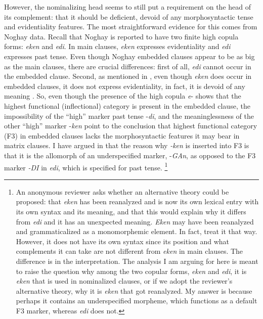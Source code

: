 \documentclass[output=paper]{langsci/langscibook}
\begin{document}
However, the nominalizing head seems to still put a requirement on the head of its complement: 
that it should be deficient, devoid of any morphosyntactic tense and evidentiality features. 
The most straightforward evidence for this comes from Noghay data. 
Recall that Noghay is reported to have two finite high copula forms: \textit{eken} and \textit{edi}. 
In main clauses, \textit{eken} expresses evidentiality and \textit{edi} expresses past tense. 
Even though Noghay embedded clauses appear to be as big as the main clauses, there are crucial differences: 
first of all, \textit{edi} cannot occur in the embedded clause. 
Second, as mentioned in , even though \textit{eken} does occur in embedded clauses, it does not express evidentiality, in fact, it is devoid of any meaning \citep{Karakoc2007}. 
So, even though the presence of the high copula \textit{e}{}- shows that the highest functional (inflectional) category is present in the embedded clause, the impossibility of the ``high'' marker past tense -\textit{di}, and the meaninglessness of the other ``high'' marker -\textit{ken} point to the conclusion that highest functional category (F3) in embedded clauses lacks the morphosyntactic features it may bear in matrix clauses. 
I have argued in \citet{Kelepir2015} that the reason why \textit{{}-ken} is inserted into F3 is that it is the allomorph of an underspecified marker, -\textit{GAn}, as opposed to the F3 marker \textit{{}-DI} in \textit{edi}, which is specified for past tense.%
    \footnote{%
        An anonymous reviewer asks whether an alternative theory could be proposed: 
        that \textit{eken} has been reanalyzed and is now its own lexical entry with its own syntax and its meaning, and that this would explain why it differs from \textit{edi} and it has an unexpected meaning. 
        \textit{Eken} may have been reanalyzed and grammaticalized as a monomorphemic element. 
        In fact, \citet{Karakoc2001,Karakoc2007} treat it that way. 
        However, it does not have its own syntax since its position and what complements it can take are not different from \textit{eken} in main clauses. 
        The difference is in the interpretation. 
        The analysis I am arguing for here is meant to raise the question why among the two copular forms, \textit{eken} and \textit{edi}, it is \textit{eken} that is used in nominalized clauses, or if we adopt the reviewer's alternative theory, why it is \textit{eken} that got reanalyzed. 
        My answer is because perhaps it contains an underspecified morpheme, which functions as a default F3 marker, whereas \textit{edi} does not.
    } 
\end{document}
